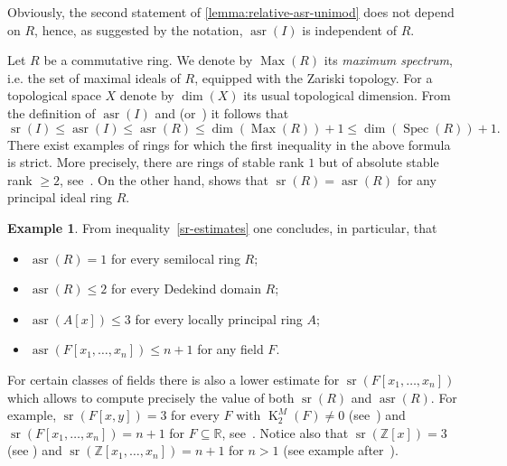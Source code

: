 \documentclass[oneside, 12pt]{amsart}
\theoremstyle{plain}
\numberwithin{equation}{section}
\numberwithin{lemma}{section}
\theoremstyle{definition}
\newtheorem{example}[lemma]{Example}
\theoremstyle{remark}
\DeclareMathOperator{\K}{K}
\DeclareMathOperator{\sr}{sr}
\DeclareMathOperator{\asr}{asr}
\DeclareMathOperator{\Max}{Max}
\DeclareMathOperator{\Spec}{Spec}
\begin{document}
Obviously, the second statement of \cref{lemma:relative-asr-unimod} does not depend on $R$, hence, as suggested by the notation, $\asr(I)$ is independent of $R$.

Let $R$ be a commutative ring. We denote by $\Max(R)$ its \emph{maximum spectrum}, i.e. the set of maximal ideals of $R$, equipped with the Zariski topology. For a topological space $X$ denote by $\dim(X)$ its usual topological dimension.
From the definition of $\asr(I)$ and \cite[Theorem~2.3]{EO} (or~\cite[Theorem~3.7]{MKV}) it follows that
\begin{equation} \label{sr-estimates} \sr(I)\leqslant\asr(I)\leqslant\asr(R)\leqslant \dim(\Max(R))+1\leqslant\dim(\Spec(R))+1. \end{equation}
There exist examples of rings for which the first inequality in the above formula is strict.
More precisely, there are rings of stable rank $1$ but of absolute stable rank $\geqslant2$, see~\cite{MKV}.
On the other hand, \cite[Theorem~1.3]{MKV} shows that $\sr(R)=\asr(R)$ for any principal ideal ring $R$.
\begin{example}
From inequality~\eqref{sr-estimates} one concludes, in particular, that 
\begin{itemize}
\item $\asr(R) = 1$ for every semilocal ring $R$;
\item $\asr(R)\leqslant2$ for every Dedekind domain $R$;
\item $\asr(A[x])\leqslant3$ for every locally principal ring $A$;
\item $\asr(F[x_1,\ldots,x_n])\leqslant n+1$ for any field $F$.
\end{itemize}
For certain classes of fields there is also a lower estimate for $\sr(F[x_1, \ldots, x_n])$ which allows to compute precisely the value of both $\sr(R)$ and $\asr(R)$.
For example, $\sr(F[x,y])=3$ for every $F$ with $\K_2^M(F)\neq0$ (see~\cite{Kru73}) and $\sr(F[x_1, \ldots, x_n])=n+1$ for $F\subseteq\mathbb{R}$, see~\cite[Theorem~8]{Va71}.
Notice also that $\sr(\mathbb{Z}[x])=3$ (see \cite{GMV}) and $\sr(\mathbb{Z}[x_1,\ldots,x_n])=n+1$ for $n>1$ (see example after~\cite[Theorem~18.2]{VS76}).
\end{example}
\end{document}
